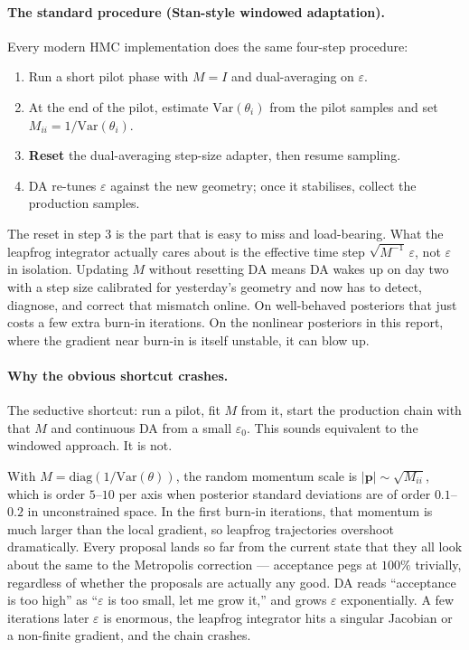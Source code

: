 \documentclass{article}
\renewcommand{\v}[1]{ \ensuremath{ {\mathbf{#1}} }}
\begin{document}
\paragraph{The standard procedure (Stan-style windowed adaptation).}
Every modern HMC implementation does the same four-step procedure:
\begin{enumerate}
\item Run a short pilot phase with $M = I$ and dual-averaging on $\varepsilon$.
\item At the end of the pilot, estimate $\mathrm{Var}(\theta_i)$ from the pilot samples and set $M_{ii} = 1 / \mathrm{Var}(\theta_i)$.
\item \textbf{Reset} the dual-averaging step-size adapter, then resume sampling.
\item DA re-tunes $\varepsilon$ against the new geometry; once it stabilises, collect the production samples.
\end{enumerate}
The reset in step 3 is the part that is easy to miss and load-bearing. What the leapfrog integrator actually cares about is the effective time step $\sqrt{M^{-1}}\,\varepsilon$, not $\varepsilon$ in isolation. Updating $M$ without resetting DA means DA wakes up on day two with a step size calibrated for yesterday's geometry and now has to detect, diagnose, and correct that mismatch online. On well-behaved posteriors that just costs a few extra burn-in iterations. On the nonlinear posteriors in this report, where the gradient near burn-in is itself unstable, it can blow up.

\paragraph{Why the obvious shortcut crashes.}
The seductive shortcut: run a pilot, fit $M$ from it, start the production chain with that $M$ and continuous DA from a small $\varepsilon_0$. This sounds equivalent to the windowed approach. It is not.

With $M = \mathrm{diag}(1/\mathrm{Var}(\theta))$, the random momentum scale is $|\v p| \sim \sqrt{M_{ii}}$, which is order $5$--$10$ per axis when posterior standard deviations are of order $0.1$--$0.2$ in unconstrained space. In the first burn-in iterations, that momentum is much larger than the local gradient, so leapfrog trajectories overshoot dramatically. Every proposal lands so far from the current state that they all look about the same to the Metropolis correction --- acceptance pegs at $100\%$ trivially, regardless of whether the proposals are actually any good. DA reads ``acceptance is too high'' as ``$\varepsilon$ is too small, let me grow it,'' and grows $\varepsilon$ exponentially. A few iterations later $\varepsilon$ is enormous, the leapfrog integrator hits a singular Jacobian or a non-finite gradient, and the chain crashes.
\end{document}
